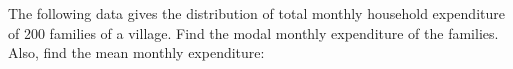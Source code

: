 \begin{flushleft}
The following data gives the distribution of total monthly household expenditure of 200
families of a village. Find the modal monthly expenditure of the families. Also, find the
mean monthly expenditure:
\end{flushleft}

\begin{table}[ht!]
\centering

\end{table} 
